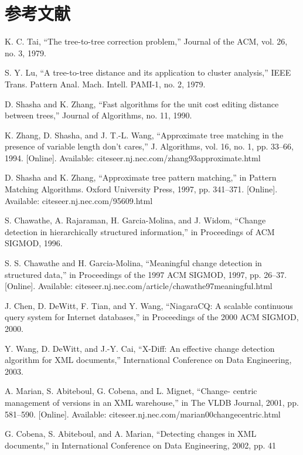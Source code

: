 \section*{参考文献}
\begin{enumerate}[{[}1{]}]
\item K. C. Tai, “The tree-to-tree correction problem,” Journal of the ACM,
  vol. 26, no. 3, 1979.
\item S. Y. Lu, “A tree-to-tree distance and its application to cluster
  analysis,” IEEE Trans. Pattern Anal. Mach. Intell. PAMI-1, no. 2, 1979.
\item D. Shasha and K. Zhang, “Fast algorithms for the unit cost editing
  distance between trees,” Journal of Algorithms, no. 11, 1990.
\item K. Zhang, D. Shasha, and J. T.-L. Wang, “Approximate tree matching in the
  presence of variable length don’t cares,” J. Algorithms, vol. 16, no. 1, pp.
  33–66, 1994. [Online]. Available: citeseer.nj.nec.com/zhang93approximate.html
\item D. Shasha and K. Zhang, “Approximate tree pattern matching,” in Pattern
  Matching Algorithms. Oxford University Press, 1997, pp. 341–371. [Online].
  Available: citeseer.nj.nec.com/95609.html
\item S. Chawathe, A. Rajaraman, H. Garcia-Molina, and J. Widom, “Change
  detection in hierarchically structured information,” in Proceedings of ACM
  SIGMOD, 1996.
\item S. S. Chawathe and H. Garcia-Molina, “Meaningful change detection in
  structured data,” in Proceedings of the 1997 ACM SIGMOD, 1997, pp. 26–37.
  [Online]. Available: citeseer.nj.nec.com/article/chawathe97meaningful.html
\item J. Chen, D. DeWitt, F. Tian, and Y. Wang, “NiagaraCQ: A scalable
  continuous query system for Internet databases,” in Proceedings of the 2000
  ACM SIGMOD, 2000.
\item Y. Wang, D. DeWitt, and J.-Y. Cai, “X-Diff: An effective change detection
  algorithm for XML documents,” International Conference on Data Engineering,
  2003.
\item A. Marian, S. Abiteboul, G. Cobena, and L. Mignet, “Change- centric
  management of versions in an XML warehouse,” in The VLDB Journal, 2001, pp.
  581–590. [Online]. Available: citeseer.nj.nec.com/marian00changecentric.html
\item G. Cobena, S. Abiteboul, and A. Marian, “Detecting changes in XML
  documents,” in International Conference on Data Engineering, 2002, pp. 41

\end{enumerate}
